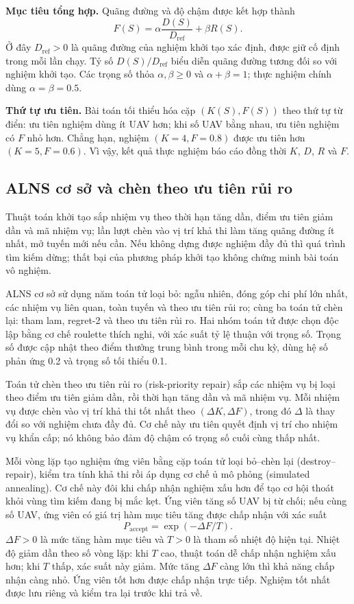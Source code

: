 \documentclass[11pt,a4paper]{article}
\begin{document}
\textbf{Mục tiêu tổng hợp.} Quãng đường và độ chậm được kết hợp thành
\begin{equation}
 F(S)=\alpha\frac{D(S)}{D_{\mathrm{ref}}}+\beta R(S).
\end{equation}
Ở đây $D_{\mathrm{ref}}>0$ là quãng đường của nghiệm khởi tạo xác định, được giữ cố định trong mỗi lần chạy. Tỷ số $D(S)/D_{\mathrm{ref}}$ biểu diễn quãng đường tương đối so với nghiệm khởi tạo. Các trọng số thỏa $\alpha,\beta\ge0$ và $\alpha+\beta=1$; thực nghiệm chính dùng $\alpha=\beta=0.5$.

\textbf{Thứ tự ưu tiên.} Bài toán tối thiểu hóa cặp $(K(S),F(S))$ theo thứ tự từ điển: ưu tiên nghiệm dùng ít UAV hơn; khi số UAV bằng nhau, ưu tiên nghiệm có $F$ nhỏ hơn. Chẳng hạn, nghiệm $(K=4,F=0.8)$ được ưu tiên hơn $(K=5,F=0.6)$. Vì vậy, kết quả thực nghiệm báo cáo đồng thời $K$, $D$, $R$ và $F$.

\subsection{ALNS cơ sở và chèn theo ưu tiên rủi ro}
Thuật toán khởi tạo sắp nhiệm vụ theo thời hạn tăng dần, điểm ưu tiên giảm dần và mã nhiệm vụ; lần lượt chèn vào vị trí khả thi làm tăng quãng đường ít nhất, mở tuyến mới nếu cần. Nếu không dựng được nghiệm đầy đủ thì quá trình tìm kiếm dừng; thất bại của phương pháp khởi tạo không chứng minh bài toán vô nghiệm.

ALNS cơ sở sử dụng năm toán tử loại bỏ: ngẫu nhiên, đóng góp chi phí lớn nhất, các nhiệm vụ liên quan, toàn tuyến và theo ưu tiên rủi ro; cùng ba toán tử chèn lại: tham lam, regret-2 và theo ưu tiên rủi ro. Hai nhóm toán tử được chọn độc lập bằng cơ chế roulette thích nghi, với xác suất tỷ lệ thuận với trọng số. Trọng số được cập nhật theo điểm thưởng trung bình trong mỗi chu kỳ, dùng hệ số phản ứng 0.2 và trọng số tối thiểu 0.1.

Toán tử chèn theo ưu tiên rủi ro (risk-priority repair) sắp các nhiệm vụ bị loại theo điểm ưu tiên giảm dần, rồi thời hạn tăng dần và mã nhiệm vụ. Mỗi nhiệm vụ được chèn vào vị trí khả thi tốt nhất theo $(\Delta K,\Delta F)$, trong đó $\Delta$ là thay đổi so với nghiệm chưa đầy đủ. Cơ chế này ưu tiên quyết định vị trí cho nhiệm vụ khẩn cấp; nó không bảo đảm độ chậm có trọng số cuối cùng thấp nhất.

Mỗi vòng lặp tạo nghiệm ứng viên bằng cặp toán tử loại bỏ--chèn lại (destroy--repair), kiểm tra tính khả thi rồi áp dụng cơ chế ủ mô phỏng (simulated annealing). Cơ chế này đôi khi chấp nhận nghiệm xấu hơn để tạo cơ hội thoát khỏi vùng tìm kiếm đang bị mắc kẹt. Ứng viên tăng số UAV bị từ chối; nếu cùng số UAV, ứng viên có giá trị hàm mục tiêu tăng được chấp nhận với xác suất
\begin{equation}
 P_{\mathrm{accept}}=\exp(-\Delta F/T).
\end{equation}
$\Delta F>0$ là mức tăng hàm mục tiêu và $T>0$ là tham số nhiệt độ hiện tại. Nhiệt độ giảm dần theo số vòng lặp: khi $T$ cao, thuật toán dễ chấp nhận nghiệm xấu hơn; khi $T$ thấp, xác suất này giảm. Mức tăng $\Delta F$ càng lớn thì khả năng chấp nhận càng nhỏ. Ứng viên tốt hơn được chấp nhận trực tiếp. Nghiệm tốt nhất được lưu riêng và kiểm tra lại trước khi trả về.
\end{document}

